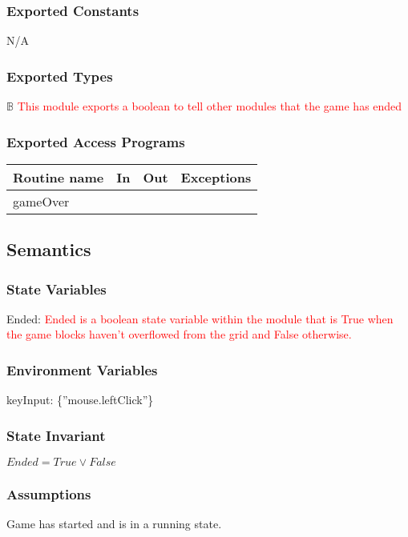 \documentclass[12pt]{article}
\begin{document}
\subsubsection* {Exported Constants}

N/A

\subsubsection* {Exported Types}

$\mathbb{B}$ \textcolor{red}{This module exports a boolean to tell other modules that the game has ended} 


\subsubsection* {Exported Access Programs}

\begin{tabular}{| l | l | l | l |}
\hline
\textbf{Routine name} & \textbf{In} & \textbf{Out} & \textbf{Exceptions}\\
\hline
gameOver &  &  & \\
\hline
\end{tabular}

\subsection* {Semantics}

\subsubsection* {State Variables}
Ended: \textcolor{red}{Ended is a boolean state variable within the module that is True when the game blocks haven't overflowed from the grid and False otherwise.} 

\subsubsection* {Environment Variables}
keyInput: \{”mouse.leftClick”\}
\subsubsection* {State Invariant}
$ Ended = True \lor False $
\subsubsection* {Assumptions}
Game has started and is in a running state.
\end{document}
